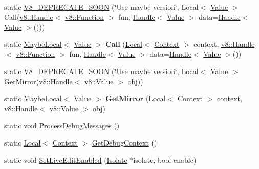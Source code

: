 \begin{DoxyCompactItemize}
\item 
static \hyperlink{classv8_1_1_debug_a54d0cb1ba8b081980153f65c86a90390}{V8\+\_\+\+D\+E\+P\+R\+E\+C\+A\+T\+E\+\_\+\+S\+O\+O\+N} (\char`\"{}Use maybe version\char`\"{}, Local$<$ \hyperlink{classv8_1_1_value}{Value} $>$ Call(\hyperlink{classv8_1_1_local}{v8\+::\+Handle}$<$ \hyperlink{classv8_1_1_function}{v8\+::\+Function} $>$ fun, \hyperlink{classv8_1_1_local}{Handle}$<$ \hyperlink{classv8_1_1_value}{Value} $>$ data=\hyperlink{classv8_1_1_local}{Handle}$<$ \hyperlink{classv8_1_1_value}{Value} $>$()))
\item 
\hypertarget{classv8_1_1_debug_a725135dd343baa2f75ad529578dbff1a}{}static \hyperlink{classv8_1_1_maybe_local}{Maybe\+Local}$<$ \hyperlink{classv8_1_1_value}{Value} $>$ {\bfseries Call} (\hyperlink{classv8_1_1_local}{Local}$<$ \hyperlink{classv8_1_1_context}{Context} $>$ context, \hyperlink{classv8_1_1_local}{v8\+::\+Handle}$<$ \hyperlink{classv8_1_1_function}{v8\+::\+Function} $>$ fun, \hyperlink{classv8_1_1_local}{Handle}$<$ \hyperlink{classv8_1_1_value}{Value} $>$ data=\hyperlink{classv8_1_1_local}{Handle}$<$ \hyperlink{classv8_1_1_value}{Value} $>$())\label{classv8_1_1_debug_a725135dd343baa2f75ad529578dbff1a}

\item 
static \hyperlink{classv8_1_1_debug_a793bef4362b7d5d2b1a2b4c8a628697b}{V8\+\_\+\+D\+E\+P\+R\+E\+C\+A\+T\+E\+\_\+\+S\+O\+O\+N} (\char`\"{}Use maybe version\char`\"{}, Local$<$ \hyperlink{classv8_1_1_value}{Value} $>$ Get\+Mirror(\hyperlink{classv8_1_1_local}{v8\+::\+Handle}$<$ \hyperlink{classv8_1_1_value}{v8\+::\+Value} $>$ obj))
\item 
\hypertarget{classv8_1_1_debug_a4737dc43ab2b2dae6a83050d453d1f3d}{}static \hyperlink{classv8_1_1_maybe_local}{Maybe\+Local}$<$ \hyperlink{classv8_1_1_value}{Value} $>$ {\bfseries Get\+Mirror} (\hyperlink{classv8_1_1_local}{Local}$<$ \hyperlink{classv8_1_1_context}{Context} $>$ context, \hyperlink{classv8_1_1_local}{v8\+::\+Handle}$<$ \hyperlink{classv8_1_1_value}{v8\+::\+Value} $>$ obj)\label{classv8_1_1_debug_a4737dc43ab2b2dae6a83050d453d1f3d}

\item 
static void \hyperlink{classv8_1_1_debug_a888e06766caee0380c6aa010b00e1a54}{Process\+Debug\+Messages} ()
\item 
static \hyperlink{classv8_1_1_local}{Local}$<$ \hyperlink{classv8_1_1_context}{Context} $>$ \hyperlink{classv8_1_1_debug_a2343a321b0db41324b7e8a7402f57cf0}{Get\+Debug\+Context} ()
\item 
static void \hyperlink{classv8_1_1_debug_ab635f979d369bed13187e2594d825517}{Set\+Live\+Edit\+Enabled} (\hyperlink{classv8_1_1_isolate}{Isolate} $\ast$isolate, bool enable)
\end{DoxyCompactItemize}


